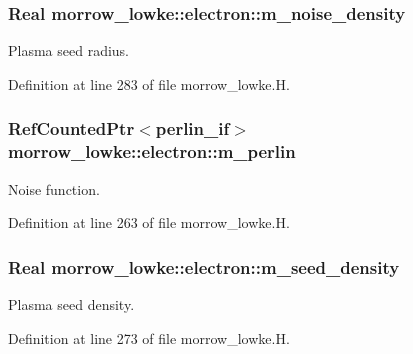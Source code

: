 \subsubsection[{\texorpdfstring{m\+\_\+noise\+\_\+density}{m_noise_density}}]{\setlength{\rightskip}{0pt plus 5cm}Real morrow\+\_\+lowke\+::electron\+::m\+\_\+noise\+\_\+density}\hypertarget{classmorrow__lowke_1_1electron_a3faa44bba699c936a673ed132dcd6eb7}{}\label{classmorrow__lowke_1_1electron_a3faa44bba699c936a673ed132dcd6eb7}


Plasma seed radius. 



Definition at line 283 of file morrow\+\_\+lowke.\+H.

\subsubsection[{\texorpdfstring{m\+\_\+perlin}{m_perlin}}]{\setlength{\rightskip}{0pt plus 5cm}Ref\+Counted\+Ptr$<${\bf perlin\+\_\+if}$>$ morrow\+\_\+lowke\+::electron\+::m\+\_\+perlin}\hypertarget{classmorrow__lowke_1_1electron_a91ed6ac04117bb2675d3547f5a680540}{}\label{classmorrow__lowke_1_1electron_a91ed6ac04117bb2675d3547f5a680540}


Noise function. 



Definition at line 263 of file morrow\+\_\+lowke.\+H.

\subsubsection[{\texorpdfstring{m\+\_\+seed\+\_\+density}{m_seed_density}}]{\setlength{\rightskip}{0pt plus 5cm}Real morrow\+\_\+lowke\+::electron\+::m\+\_\+seed\+\_\+density}\hypertarget{classmorrow__lowke_1_1electron_a2a08bbb94c44f7f1921471e5c63cfb00}{}\label{classmorrow__lowke_1_1electron_a2a08bbb94c44f7f1921471e5c63cfb00}


Plasma seed density. 



Definition at line 273 of file morrow\+\_\+lowke.\+H.

